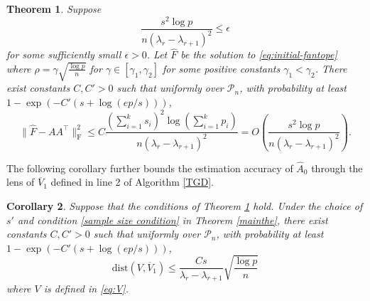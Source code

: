 \documentclass[11pt]{article}
\newcommand{\nb}[1]{\textcolor{orange}{\texttt{[#1]}}}
\newcommand{\gsc}[1]{\textcolor{blue}{\texttt{[#1]}}}
\newcommand{\norminit}{\widetilde{A}_0} %
\newcommand{\hs}{s'}
\newcommand{\scale}{V}
\newcommand{\gd}{\overline{V}}
\newcommand{\dist}{\mathrm{dist}}
\newcommand{\0}{{\mathbf{0}}}
\newcommand{\ssecond}{{\widehat{\Sigma}}}
\newtheorem{theorem}{Theorem}[section]
\newtheorem{corollary}[theorem]{Corollary}
\begin{document}
\begin{theorem}\label{theo:init}
Suppose 
\begin{equation}
      \label{init: sample size}
    \frac{s^2\log p}{n(\lambda_r-\lambda_{r+1})^2}\leq \epsilon
\end{equation} 
 for some sufficiently small $\epsilon > 0$.
Let $\widehat{F}$ be the solution to 
\eqref{eq:initial-fantope} 
 where $\rho=\gamma\sqrt{\frac{\log p}{n}}$ for $\gamma\in[\gamma_1,\gamma_2]$ for some positive constants $\gamma_1<\gamma_2$.
There exist constants $C,C'>0$ such that 
uniformly over $\mathcal{P}_n$, with probability at least $1-\exp(-C'(s+\log(ep/s)))$,
\begin{equation}
\|\widehat{F}-AA^\top  \|_\mathrm{F}^2\leq C\frac{(\sum_{i=1}^{k}s_i)^2\log(\sum_{i=1}^{k}p_i)}{n(\lambda_r-\lambda_{r+1})^2}
=O\left(
\frac{s^2\log p}{n(\lambda_r-\lambda_{r+1})^2} 
\right).
\end{equation}
\end{theorem}

The following corollary further bounds the estimation accuracy of $\widehat{A}_0$ through the lens of $\overline{V}_1$ defined in line 2 of Algorithm \ref{TGD}. 

\begin{corollary}
      \label{cor:init}
Suppose that the conditions of Theorem \ref{theo:init} hold.
{Under the choice of $s'$ and condition \eqref{sample size condition} in Theorem \ref{mainthe},}
there exist constants $C,C'>0$ such that 
uniformly over $\mathcal{P}_n$, with probability at least $1-\exp(-C'(s+\log(ep/s)))$,
\begin{equation*}
\dist(\scale,\gd_1)\leq 
\frac{C s}{\lambda_r-\lambda_{r+1}}\sqrt{\frac{\log p}{n}}
\end{equation*}
where $V$ is defined in \eqref{eq:V}.
\end{corollary}
\end{document}
